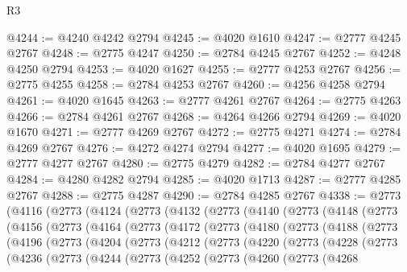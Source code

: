 \begin{lexlean}{R3}
\begin{coremodule}
@4244 := @4240 @4242 @2794
@4245 := @4020 @1610
@4247 := @2777 @4245 @2767
@4248 := @2775 @4247
@4250 := @2784 @4245 @2767
@4252 := @4248 @4250 @2794
@4253 := @4020 @1627
@4255 := @2777 @4253 @2767
@4256 := @2775 @4255
@4258 := @2784 @4253 @2767
@4260 := @4256 @4258 @2794
@4261 := @4020 @1645
@4263 := @2777 @4261 @2767
@4264 := @2775 @4263
@4266 := @2784 @4261 @2767
@4268 := @4264 @4266 @2794
@4269 := @4020 @1670
@4271 := @2777 @4269 @2767
@4272 := @2775 @4271
@4274 := @2784 @4269 @2767
@4276 := @4272 @4274 @2794
@4277 := @4020 @1695
@4279 := @2777 @4277 @2767
@4280 := @2775 @4279
@4282 := @2784 @4277 @2767
@4284 := @4280 @4282 @2794
@4285 := @4020 @1713
@4287 := @2777 @4285 @2767
@4288 := @2775 @4287
@4290 := @2784 @4285 @2767
@4338 := @2773
    (@4116
      (@2773
        (@4124
          (@2773
            (@4132
              (@2773
                (@4140
                  (@2773
                    (@4148
                      (@2773
                        (@4156
                          (@2773
                            (@4164
                              (@2773
                                (@4172
                                  (@2773
                                    (@4180
                                      (@2773
                                        (@4188
                                          (@2773
                                            (@4196
                                              (@2773
                                                (@4204
                                                  (@2773
                                                    (@4212
                                                      (@2773
                                                        (@4220
                                                          (@2773
                                                            (@4228
                                                              (@2773
                                                                (@4236
                                                                  (@2773
                                                                    (@4244
                                                                      (@2773
                                                                        (@4252
                                                                          (@2773
                                                                            (@4260
                                                                              (@2773
                                                                                (@4268

\end{coremodule}
\end{lexlean}
